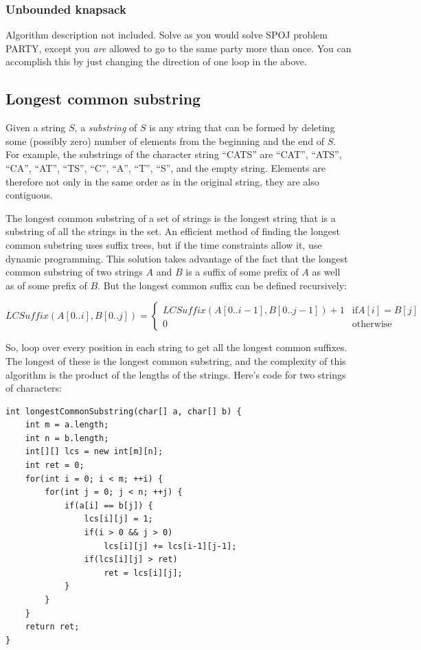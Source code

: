 \documentclass[a4paper,12pt]{article}
\begin{document}
\subsubsection{Unbounded knapsack}

Algorithm description not included. Solve as you would solve SPOJ problem PARTY, except you {\em are} allowed to go to the same party more than once. You can accomplish this by just changing the direction of one loop in the above.

\subsection{Longest common substring}

Given a string $S$, a {\em substring} of $S$ is any string that can be formed by deleting some (possibly zero) number of elements from the beginning and the end of $S$. For example, the substrings of the character string ``CATS'' are ``CAT'', ``ATS'', ``CA'', ``AT'', ``TS'', ``C'', ``A'', ``T'', ``S'', and the empty string. Elements are therefore not only in the same order as in the original string, they are also contiguous. 

The longest common substring of a set of strings is the longest string that is a substring of all the strings in the set. An efficient method of finding the longest common substring uses suffix trees, but if the time constraints allow it, use dynamic programming. This solution takes advantage of the fact that the longest common substring of two strings $A$ and $B$ is a suffix of some prefix of $A$ as well as of some prefix of $B$. But the longest common suffix can be defined recursively:

\[\mathit{LCSuffix}(A[0..i], B[0..j]) =
\begin{cases}
\mathit{LCSuffix}(A[0..i-1], B[0..j-1]) + 1 & \mathrm{if } A[i] = B[j] \\
0 & \mathrm{otherwise}
\end{cases}\]

So, loop over every position in each string to get all the longest common suffixes. The longest of these is the longest common substring, and the complexity of this algorithm is the product of the lengths of the strings. Here's code for two strings of characters:
\begin{lstlisting}
int longestCommonSubstring(char[] a, char[] b) {
	int m = a.length;
	int n = b.length;
	int[][] lcs = new int[m][n];
	int ret = 0;
	for(int i = 0; i < m; ++i) {
		for(int j = 0; j < n; ++j) {
			if(a[i] == b[j]) {
				lcs[i][j] = 1;
				if(i > 0 && j > 0)
					lcs[i][j] += lcs[i-1][j-1];
				if(lcs[i][j] > ret)
					ret = lcs[i][j];
			}
		}
	}
	return ret;
}
\end{lstlisting}
\end{document}
